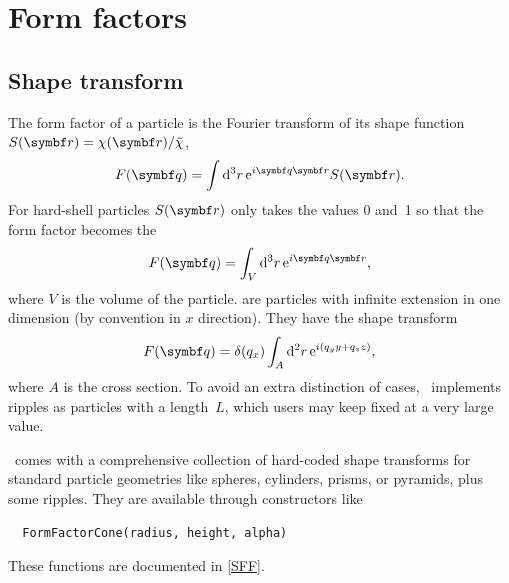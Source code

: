 \section{Form factors}\label{SFormFactor}


\subsection{Shape transform}

The form factor %
of a particle is the Fourier transform
of its shape function $S(\r)=\chi(\r)/\tilde\chi$,
%
%
%
\begin{equation}
  F(\q)=\int {\rm d}^3r\, {\rm e}^{i\q\r} S(\r).
\end{equation}
For hard-shell particles %
$S(\r)$ only takes the values 0 and~1
so that the form factor becomes
the 
%
\begin{equation}\label{EFFhardshell}
  F(\q)=\int_V {\rm d}^3r\, {\rm e}^{i\q\r},
\end{equation}
where $V$ is the volume of the particle.
%
%
 are particles with infinite extension in one dimension
(by convention in $x$ direction).
They have the shape transform
\begin{equation}\label{EFFripple}
  F(\q)=\delta(q_x)\int_A {\rm d}^2r\, {\rm e}^{i(q_y y + q_z z)},
\end{equation}
where $A$ is the cross section.
To avoid an extra distinction of cases,
\BornAgain\ implements ripples as particles with a  length~$L$,
which users may keep fixed at a very large value.

\BornAgain\ comes with a comprehensive collection of hard-coded
shape transforms for standard particle geometries like
spheres, cylinders, prisms, or pyramids,
plus some ripples.
They are available through constructors like
\begin{lstlisting}
  FormFactorCone(radius, height, alpha)
\end{lstlisting}
These functions are documented in \cref{SFF}.

